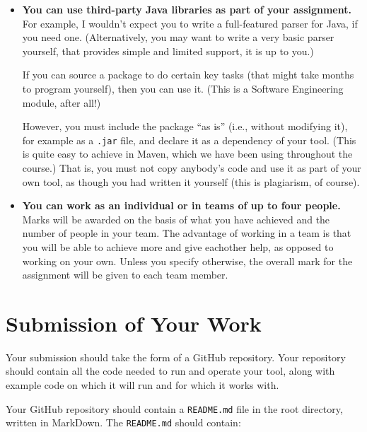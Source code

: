\begin{itemize}
    \item {\bf You can use third-party Java libraries as part of your
    assignment.} For example, I wouldn't expect you to write a full-featured
    parser for Java, if you need one. (Alternatively, you may want to write a
    very basic parser yourself, that provides simple and limited support, it is
    up to you.)
    
    If you can source a package to do certain key tasks (that might take months
    to program yourself), then you can use it. (This is a Software Engineering
    module, after all!)
    
    However, you must include the package ``as is'' (i.e., without modifying
    it), for example as a {\tt .jar} file, and declare it as a dependency of
    your tool. (This is quite easy to achieve in Maven, which we have been using
    throughout the course.) That is, you must not copy anybody's code and use it
    as part of your own tool, as though you had written it yourself (this is
    plagiarism, of course).

    \item {\bf You can work as an individual or in teams of up to four people.}    
    Marks will be awarded on the basis of what you have achieved and the number
    of people in your team. The advantage of working in a team is that you will
    be able to achieve more and give eachother help, as opposed to working on
    your own. Unless you specify otherwise, the overall mark for the assignment
    will be given to each team member.
\end{itemize}


\section{Submission of Your Work}

Your submission should take the form of a GitHub repository. Your repository
should contain all the code needed to run and operate your tool, along with
example code on which it will run and for which it works with.

Your GitHub repository should contain a {\tt README.md} file in the root
directory, written in MarkDown. The {\tt README.md} should contain:

